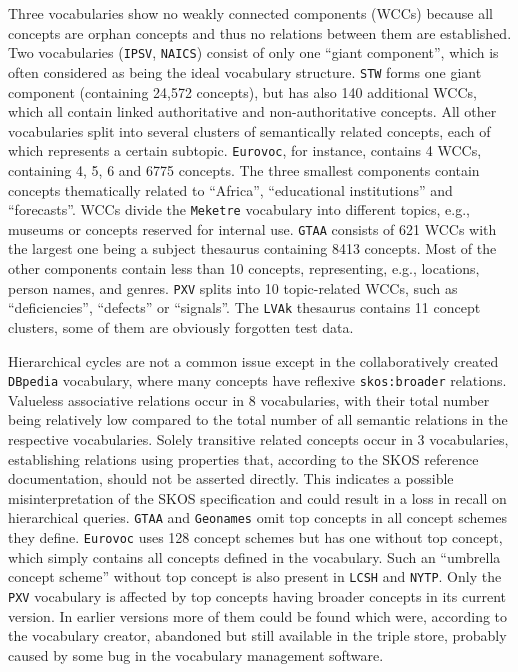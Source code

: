 
Three vocabularies show no weakly connected components (WCCs) because all concepts are orphan concepts and thus no relations between them are established. Two vocabularies (\texttt{IPSV}, \texttt{NAICS}) consist of only one ``giant component'', which is often considered as being the ideal vocabulary structure. \texttt{STW} forms one giant component (containing 24,572 concepts), but has also 140 additional WCCs, which all contain linked authoritative and non-authoritative concepts. All other vocabularies split into several clusters of semantically related concepts, each of which represents a certain subtopic. \texttt{Eurovoc}, for instance, contains 4 WCCs, containing 4, 5, 6 and 6775 concepts. The three smallest components contain concepts thematically related to ``Africa'', ``educational institutions'' and ``forecasts''. WCCs divide the \texttt{Meketre} vocabulary into different topics, e.g., museums or concepts reserved for internal use. \texttt{GTAA} consists of 621 WCCs with the largest one being a subject thesaurus containing 8413 concepts. Most of the other components contain less than 10 concepts, representing, e.g., locations, person names, and genres. \texttt{PXV} splits into 10 topic-related WCCs, such as ``deficiencies'', ``defects'' or ``signals''. The \texttt{LVAk} thesaurus contains 11 concept clusters, some of them are obviously forgotten test data. 

Hierarchical cycles are not a common issue except in the collaboratively created \texttt{DBpedia} vocabulary, where many concepts have reflexive \texttt{skos:broader} relations.
Valueless associative relations occur in 8 vocabularies, with their total number being relatively low compared to the total number of all semantic relations in the respective vocabularies.
Solely transitive related concepts occur in 3 vocabularies, establishing relations using properties that, according to the SKOS reference documentation, should not be asserted directly. This indicates a possible misinterpretation of the SKOS specification and could result in a loss in recall on hierarchical queries.
\texttt{GTAA} and \texttt{Geonames} omit top concepts in all concept schemes they define. \texttt{Eurovoc} uses 128 concept schemes but has one without top concept, which simply contains all concepts defined in the vocabulary. Such an ``umbrella concept scheme'' without top concept is also present in \texttt{LCSH} and \texttt{NYTP}.
Only the \texttt{PXV} vocabulary is affected by top concepts having broader concepts in its current version. In earlier versions more of them could be found which were, according to the vocabulary creator, abandoned but still available in the triple store, probably caused by some bug in the vocabulary management software.


